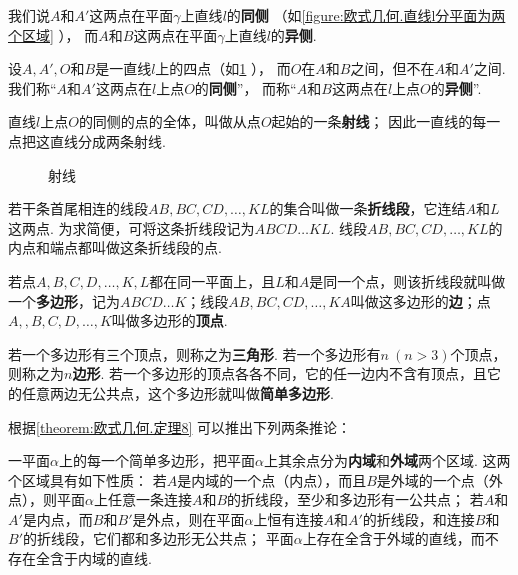 \begin{definition}
我们说\(A\)和\(A'\)这两点在平面\(\gamma\)上直线\(l\)的\textbf{同侧}%
（如\cref{figure:欧式几何.直线l分平面为两个区域} ），%
而\(A\)和\(B\)这两点在平面\(\gamma\)上直线\(l\)的\textbf{异侧}.%
\end{definition}

\begin{definition}
设\(A,A',O\)和\(B\)是一直线\(l\)上的四点（如\cref{figure:欧式几何.射线} ），%
而\(O\)在\(A\)和\(B\)之间，但不在\(A\)和\(A'\)之间.
我们称“\(A\)和\(A'\)这两点在\(l\)上点\(O\)的\textbf{同侧}”，%
而称“\(A\)和\(B\)这两点在\(l\)上点\(O\)的\textbf{异侧}”.

直线\(l\)上点\(O\)的同侧的点的全体，叫做从点\(O\)起始的一条\textbf{射线}；
因此一直线的每一点把这直线分成两条射线.
\begin{figure}[ht]
\centering
{}
\caption{射线}
\label{figure:欧式几何.射线}
\end{figure}
\end{definition}

\begin{definition}
若干条首尾相连的线段\(AB,BC,CD,\dotsc,KL\)的集合叫做一条\textbf{折线段}，它连结\(A\)和\(L\)这两点.
为求简便，可将这条折线段记为\(ABCD \dotso KL\).
线段\(AB,BC,CD,\dotsc,KL\)的内点和端点都叫做这条折线段的点.

若点\(A,B,C,D,\dotsc,K,L\)都在同一平面上，且\(L\)和\(A\)是同一个点，则该折线段就叫做一个\textbf{多边形}，记为\(ABCD \dotso K\)；线段\(AB,BC,CD,\dotsc,KA\)叫做这多边形的\textbf{边}；点\(A,,B,C,D,\dotsc,K\)叫做多边形的\textbf{顶点}.

若一个多边形有三个顶点，则称之为\textbf{三角形}.
若一个多边形有\(n\ (n>3)\)个顶点，则称之为\(n\)\textbf{边形}.
若一个多边形的顶点各各不同，它的任一边内不含有顶点，且它的任意两边无公共点，这个多边形就叫做\textbf{简单多边形}.
\end{definition}

根据\cref{theorem:欧式几何.定理8} 可以推出下列两条推论：
\begin{corollary}\label{theorem:欧式几何.定理9}
一平面\(\alpha\)上的每一个简单多边形，把平面\(\alpha\)上其余点分为\textbf{内域}和\textbf{外域}两个区域.
这两个区域具有如下性质：
若\(A\)是内域的一个点（内点），而且\(B\)是外域的一个点（外点），则平面\(\alpha\)上任意一条连接\(A\)和\(B\)的折线段，至少和多边形有一公共点；
若\(A\)和\(A'\)是内点，而\(B\)和\(B'\)是外点，则在平面\(\alpha\)上恒有连接\(A\)和\(A'\)的折线段，和连接\(B\)和\(B'\)的折线段，它们都和多边形无公共点；
平面\(\alpha\)上存在全含于外域的直线，而不存在全含于内域的直线.
\end{corollary}

